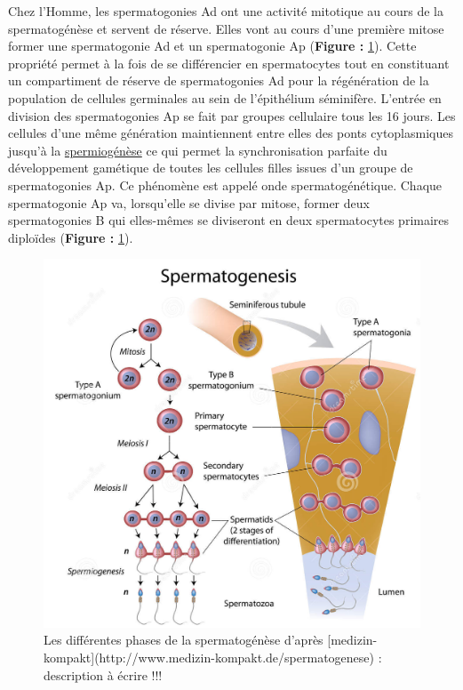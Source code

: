 \documentclass[12pt,twoside]{reedthesis}
\theoremstyle{definition}
\theoremstyle{definition}
\theoremstyle{remark}
\begin{document}
  Chez l'Homme, les spermatogonies Ad ont une activité mitotique au cours
  de la spermatogénèse et servent de réserve. Elles vont au cours d'une
  première mitose former une spermatogonie Ad et un spermatogonie Ap
  (\textbf{Figure :} \ref{fig:spermatogenese}). Cette propriété permet à
  la fois de se différencier en spermatocytes tout en constituant un
  compartiment de réserve de spermatogonies Ad pour la régénération de la
  population de cellules germinales au sein de l'épithélium séminifère.
  L'entrée en division des spermatogonies Ap se fait par groupes
  cellulaire tous les 16 jours. Les cellules d'une même génération
  maintiennent entre elles des ponts cytoplasmiques jusqu'à la
  \protect\hyperlink{spermiogenese}{spermiogénèse} ce qui permet la
  synchronisation parfaite du développement gamétique de toutes les
  cellules filles issues d'un groupe de spermatogonies Ap. Ce phénomène
  est appelé onde spermatogénétique. Chaque spermatogonie Ap va,
  lorsqu'elle se divise par mitose, former deux spermatogonies B qui
  elles-mêmes se diviseront en deux spermatocytes primaires diploïdes
  (\textbf{Figure :} \ref{fig:spermatogenese}).
  
  \begin{figure}
  
  {\centering \includegraphics[scale=0.35]{figure/spermatogenese2} 
  
  }
  
  \caption{Les différentes phases de la spermatogénèse d'après [medizin-kompakt](http://www.medizin-kompakt.de/spermatogenese) : description à écrire !!!}\label{fig:spermatogenese}
  \end{figure}
  
\end{document}
